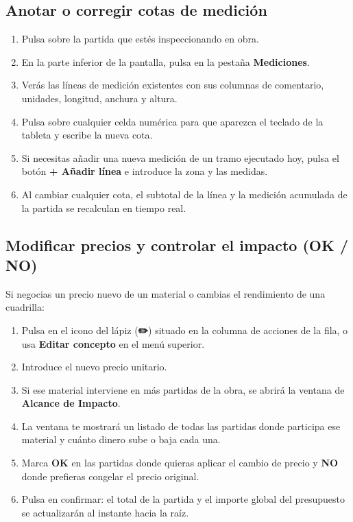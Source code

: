 \documentclass[11pt,a4paper]{article}
\begin{document}
\subsection{Anotar o corregir cotas de medición}
\begin{enumerate}[leftmargin=*]
    \item Pulsa sobre la partida que estés inspeccionando en obra.
    \item En la parte inferior de la pantalla, pulsa en la pestaña \textbf{Mediciones}.
    \item Verás las líneas de medición existentes con sus columnas de comentario, unidades, longitud, anchura y altura.
    \item Pulsa sobre cualquier celda numérica para que aparezca el teclado de la tableta y escribe la nueva cota.
    \item Si necesitas añadir una nueva medición de un tramo ejecutado hoy, pulsa el botón \textbf{+ Añadir línea} e introduce la zona y las medidas.
    \item Al cambiar cualquier cota, el subtotal de la línea y la medición acumulada de la partida se recalculan en tiempo real.
\end{enumerate}

\subsection{Modificar precios y controlar el impacto (OK / NO)}
Si negocias un precio nuevo de un material o cambias el rendimiento de una cuadrilla:
\begin{enumerate}[leftmargin=*]
    \item Pulsa en el icono del lápiz (\textbf{✏️}) situado en la columna de acciones de la fila, o usa \textbf{Editar concepto} en el menú superior.
    \item Introduce el nuevo precio unitario.
    \item Si ese material interviene en más partidas de la obra, se abrirá la ventana de \textbf{Alcance de Impacto}.
    \item La ventana te mostrará un listado de todas las partidas donde participa ese material y cuánto dinero sube o baja cada una.
    \item Marca \textbf{OK} en las partidas donde quieras aplicar el cambio de precio y \textbf{NO} donde prefieras congelar el precio original.
    \item Pulsa en confirmar: el total de la partida y el importe global del presupuesto se actualizarán al instante hacia la raíz.
\end{enumerate}
\end{document}
